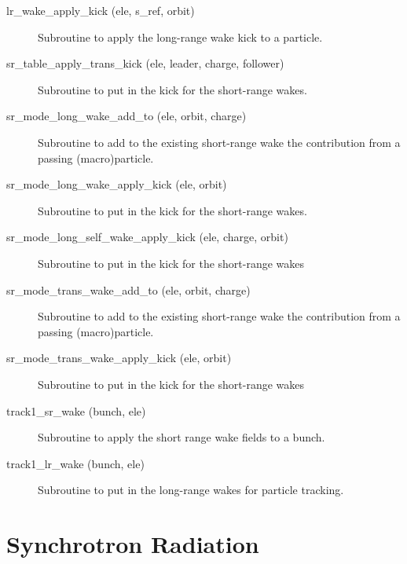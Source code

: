 \begin{description}

\item[lr_wake_apply_kick (ele, s_ref, orbit)] \Newline 
Subroutine to apply the long-range wake kick to a particle.

\item[sr_table_apply_trans_kick (ele, leader, charge, follower)] \Newline 
Subroutine to put in the kick for the short-range wakes.

\item[sr_mode_long_wake_add_to (ele, orbit, charge)] \Newline 
Subroutine to add to the existing short-range wake the contribution from
a passing (macro)particle.

\item[sr_mode_long_wake_apply_kick (ele, orbit)] \Newline 
Subroutine to put in the kick for the short-range wakes.

\item[sr_mode_long_self_wake_apply_kick (ele, charge, orbit)] \Newline 
Subroutine to put in the kick for the short-range wakes

\item[sr_mode_trans_wake_add_to (ele, orbit, charge)] \Newline 
Subroutine to add to the existing short-range wake the contribution from
a passing (macro)particle.

\item[sr_mode_trans_wake_apply_kick (ele, orbit)] \Newline 
Subroutine to put in the kick for the short-range wakes

\item[track1_sr_wake (bunch, ele)] \Newline 
Subroutine to apply the short range wake fields to a bunch. 

\item[track1_lr_wake (bunch, ele)] \Newline 
Subroutine to put in the long-range wakes for particle tracking.

\end{description}

\section{Synchrotron Radiation}
\label{r:synch_rad}


